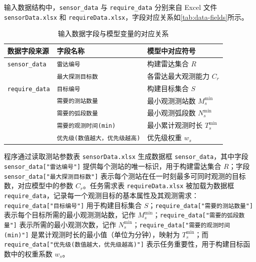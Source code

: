 \documentclass[openany,zihao=-4,UTF8]{ctexart}
\begin{document}
输入数据结构中，\texttt{sensor\_data} 与 \texttt{require\_data} 分别来自 Excel 文件 \texttt{sensorData.xlsx} 和 \texttt{requireData.xlsx}，字段对应关系如\autoref{tab:data-fields}所示。
\begin{table}[H]
    \centering
    \caption{输入数据字段与模型变量的对应关系}
    \label{tab:data-fields}
    \begin{tabular}{lll}
        \toprule
        \textbf{数据字段来源}        & \textbf{字段名称}            & \textbf{模型中对应符号}      \\
        \midrule
        \texttt{sensor\_data}  & \texttt{雷达编号}            & 构建雷达集合 $R$            \\
                               & \texttt{最大探测目标数}         & 各雷达最大观测能力 $C_r$       \\
        \addlinespace
        \texttt{require\_data} & \texttt{目标编号}            & 构建目标集合 $S$            \\
                               & \texttt{需要的测站数量}         & 最小观测测站数 $M_s^{\min}$  \\
                               & \texttt{需要的弧段数量}         & 最小观测弧段数 $N_s^{\min}$  \\
                               & \texttt{需要的观测时间(min)}    & 最小累计观测时长 $T_s^{\min}$ \\
                               & \texttt{优先级(数值越大，优先级越高)} & 优先级权重 $w_s$           \\
        \bottomrule
    \end{tabular}
\end{table}

程序通过读取测站参数表 \texttt{sensorData.xlsx} 生成数据框 \texttt{sensor\_data}，其中字段 \texttt{sensor\_data["雷达编号"]} 提供每个测站的唯一标识，用于构建雷达集合 $R$；字段 \texttt{sensor\_data["最大探测目标数"]} 表示每个测站在任一时刻最多可同时观测的目标数，对应模型中的参数 $C_r$。任务需求表 \texttt{requireData.xlsx} 被加载为数据框 \texttt{require\_data}，记录每一个观测目标的基本属性及其观测需求：\texttt{require\_data["目标编号"]} 用于构建目标集合 $S$；\texttt{require\_data["需要的测站数量"]} 表示每个目标所需的最小观测测站数，记作 $M_s^{\min}$；\texttt{require\_data["需要的弧段数量"]} 表示所需的最小观测次数，记作 $N_s^{\min}$；\texttt{require\_data["需要的观测时间(min)"]} 是累计观测时长的最小值（单位为分钟），映射为 $T_s^{\min}$；而 \texttt{require\_data["优先级(数值越大，优先级越高)"]} 表示任务重要性，用于构建目标函数中的权重系数 $w_s$。
\end{document}
